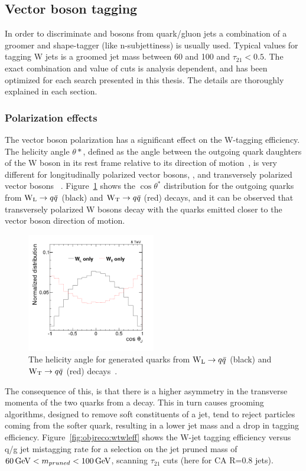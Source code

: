 \subsection{Vector boson tagging}
In order to discriminate \PW and \PZ bosons from quark/gluon jets a combination of a groomer and shape-tagger (like n-subjettiness) is usually used.
Typical values for tagging W jets is a groomed jet mass between 60 and 100 \GeV and $\tau_{21}<0.5$. The exact combination and value of cuts is analysis dependent, and has been optimized for each search presented in this thesis. The details are thoroughly explained in each section.


\subsubsection{Polarization effects}
\label{sec:objreco:pol}
The vector boson polarization has a significant effect on the W-tagging efficiency. The helicity angle $\theta*$, defined as the angle between the outgoing quark daughters of the W boson in its rest frame relative to its direction of motion~\cite{PhysRevD.86.095031}, is very different for longitudinally polarized vector bosons, \PWL, and transversely polarized vector bosons \PWT ~\cite{Khachatryan:2014vla}. Figure~\ref{fig:objreco:wtwlcostheta} shows the $\cos \theta^*$ distribution for the outgoing quarks from $\mathrm{W}_{\mathrm{L}} \rightarrow q \bar {q}$ (black) and $\mathrm{W}_{\mathrm{T}} \rightarrow q \bar{q}$ (red) decays, and it can be observed that transversely polarized W bosons decay with the quarks emitted closer to the vector boson direction of motion.
\begin{figure}[h] 
    \centering 
    \includegraphics[width=0.5\textwidth]{figures/event_reconstruction/cosThetaJJ_GEN.png}
     \caption{The helicity angle for generated quarks from $\mathrm{W}_{\mathrm{L}}\rightarrow q\bar{q}$ (black) and $\mathrm{W}_{\mathrm{T}}\rightarrow q\bar{q}$ (red) decays~\cite{Khachatryan:2014vla}.}
     \label{fig:objreco:wtwlcostheta}
 \end{figure}
The consequence of this, is that there is a higher asymmetry in the transverse momenta of the two quarks from a \PWT decay. This in turn causes grooming algorithms, designed to remove soft constituents of a jet, tend to reject particles coming from the softer quark, resulting in a lower jet mass and a drop in tagging efficiency. Figure~\ref{fig:objreco:wtwleff} shows the W-jet tagging efficiency versus q/g jet mistagging rate for a selection on the jet pruned mass of $60 \,\text{Ge\hspace{-.08em}V} < m_{pruned} < 100 \,\text{Ge\hspace{-.08em}V}$, scanning $\tau_{21}$ cuts (here for CA R=0.8 jets).

